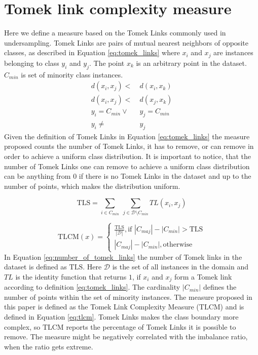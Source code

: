 \section{Tomek link complexity measure}
Here we define a measure based on the Tomek Links  commonly used in undersampling. Tomek Links are pairs of mutual nearest neighbors of opposite classes, as described in Equation \ref{eq:tomek_links} where $x_i$ and $x_j$ are instances belonging to class $y_i$ and $y_j$. The point $x_k$ is an arbitrary point in the dataset. $C_{min}$ is set of minority class instances. 
\begin{align}
    d(x_i,x_j) <&\ d(x_i,x_k) \label{eq:tomek_links} \\
    \nonumber d(x_i,x_j) <&\ d(x_j,x_k) \\
    \nonumber y_i=C_{min} \lor&\ y_j = C_{min} \\
    \nonumber y_i \neq&\ y_j 
\end{align}
Given the definition of Tomek Links in Equation \ref{eq:tomek_links} the measure proposed counts the number of Tomek Links, it has to remove, or can remove in order to achieve a uniform class distribution. It is important to notice, that the number of Tomek Links one can remove to achieve a uniform class distribution can be anything from $0$ if there is no Tomek Links in the dataset and up to the number of points, which makes the distribution uniform.

\begin{equation}
    \label{eq:number_of_tomek_links}
    \text{TLS} = \sum_{i \in C_{min}}\ \sum_{j \in \mathcal{D} \setminus C_{min}} TL(x_i,x_j)
\end{equation}

\begin{equation}
    \label{eq:tlcm}
    \text{TLCM}(x)= 
\begin{cases}
    \frac{\text{TLS}}{|\mathcal{D}|},\text{if } |C_{maj}|-|C_{min}| > \text{TLS}\\
    |C_{maj}|-|C_{min}|, \text{otherwise}
\end{cases}
\end{equation}
In Equation \ref{eq:number_of_tomek_links} the number of Tomek links in the dataset is defined as $\text{TLS}$. Here $\mathcal{D}$ is the set of all instances in the domain and $TL$ is the identity function that returns $1$, if $x_i$ and $x_j$ form a Tomek link according to definition \ref{eq:tomek_links}. The cardinality $|C_{min}|$ defines the number of points within the set of minority instances. The measure proposed in this paper is defined as the Tomek Link Complexity Measure ($\text{TLCM}$) and is defined in Equation \ref{eq:tlcm}.
Tomek Links makes the class boundary more complex, so $\text{TLCM}$ reports the percentage of Tomek Links it is possible to remove. The measure might be negatively correlated with the imbalance ratio, when the ratio gets extreme. 



